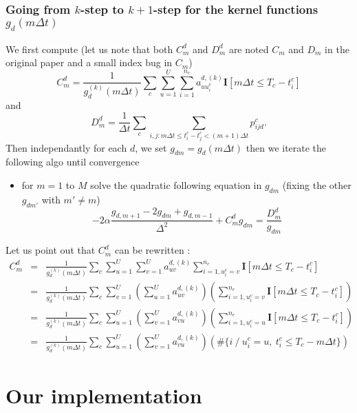 \documentclass[11pt]{article}%
\begin{document}
\subsubsection{\texorpdfstring{Going from $k$-step to $k+1$-step for the kernel functions $g_d(m\Delta t)$}
                              {Change step for the kernel functions}}
We first compute (let us note that both $C_{m}^d$ and $D_{m}^d$ are noted $C_m$ and $D_m$ in the original paper and a small index bug in $C_m$)
\begin{equation}
C_{m}^d = \frac{1}{g_d^{(k)}(m\Delta t)} \sum_c \sum_{u=1}^U\sum_{i=1}^{n_c} a_{uu_i^c}^{d,(k)} \mathbf{I}[m\Delta t \le T_c - t_i^c]
\end{equation} 
and
\begin{equation}
D_{m}^d = \frac 1 {\Delta t} \sum_c \sum_{i,j:m\Delta t \le t_i^c-t_j^c<(m+1)\Delta t} p_{ijd}^c.
\end{equation}
Then independantly for each $d$, we set $g_{dm} = g_d(m\Delta t)$ then we iterate the following algo until convergence
\begin{itemize}
\item for $m=1$ to $M$ solve the quadratic following equation in $g_{dm}$ (fixing the other $g_{dm'}$ with $m'\neq m$)
\begin{equation}
\label{ODE}
-2\alpha \frac{g_{d,m+1} -2g_{dm}+g_{d,m-1}}{\Delta^2} + C_{m}^dg_{dm} = \frac{D_{m}^d}{g_{dm}}
\end{equation}
\end{itemize}
Let us point out that $C_m^d$ can be rewritten :
\begin{eqnarray}
C_{m}^d & = & \frac{1}{g_d^{(k)}(m\Delta t)} \sum_c \sum_{u=1}^U\sum_{v=1}^U a_{uv}^{d,(k)} \sum_{i=1, u_i^c = v}^{n_c}  \mathbf{I}[m\Delta t \le T_c - t_i^c] \\
& = &\frac{1}{g_d^{(k)}(m\Delta t)} \sum_c \sum_{v=1}^U \left( \sum_{u=1}^U a_{uv}^{d,(k)}\right) 
\left( \sum_{i=1, u_i^c = v}^{n_c}   \mathbf{I}[m\Delta t \le T_c - t_i^c] \right)\\
& = &\frac{1}{g_d^{(k)}(m\Delta t)} \sum_c \sum_{u=1}^U  
\left(\sum_{v=1}^U a_{vu}^{d,(k)}\right)
\left(\sum_{i=1, u_i^c = u}^{n_c}\mathbf{I}[m\Delta t \le T_c - t_i^c] \right) \\
& = &\frac{1}{g_d^{(k)}(m\Delta t)} \sum_c \sum_{u=1}^U  
\left(\sum_{v=1}^U a_{vu}^{d,(k)}\right)
\left(\#\{i~/ ~u_i^c=u,~t_i^c\le T_c-m\Delta t\}\right)
\end{eqnarray} 
\section{Our implementation}
\end{document}

